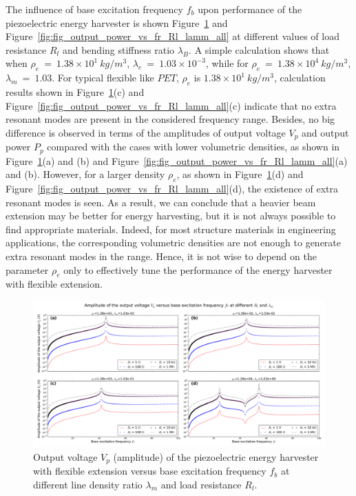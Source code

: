 \documentclass{elsarticle}
\begin{document}
The influence of base excitation frequency $f_b$ upon performance of the piezoelectric energy harvester is shown Figure~\ref{fig:fig_output_voltage_vs_fr_Rl_lamm_all} and Figure~\ref{fig:fig_output_power_vs_fr_Rl_lamm_all} at different values of load resistance $R_l$ and bending stiffness ratio $\lambda_B$. A simple calculation shows that when $\rho_e\ =\ 1.38\times10^1\ kg/m^3$, $\lambda_e\ =\ 1.03\times10^{-3}$, while for $\rho_e\ =\ 1.38\times10^4\ kg/m^3$, $\lambda_m\ =\ 1.03$. For typical flexible like $PET$\cite{dean1999lange}, $\rho_e$ is $1.38\times10^1\ kg/m^3$, calculation results shown in Figure~\ref{fig:fig_output_voltage_vs_fr_Rl_lamm_all}(c) and Figure~\ref{fig:fig_output_power_vs_fr_Rl_lamm_all}(c) indicate that no extra resonant modes are present in the considered frequency range. Besides, no big difference is observed in terms of the amplitudes of output voltage $V_p$ and output power $P_p$ compared with the cases with lower volumetric densities, as shown in Figure~\ref{fig:fig_output_voltage_vs_fr_Rl_lamm_all}(a) and (b) and Figure~\ref{fig:fig_output_power_vs_fr_Rl_lamm_all}(a) and (b). However, for a larger density $\rho_e$, as shown in Figure~\ref{fig:fig_output_voltage_vs_fr_Rl_lamm_all}(d) and Figure~\ref{fig:fig_output_power_vs_fr_Rl_lamm_all}(d), the existence of extra resonant modes is seen. As a result, we can conclude that a heavier beam extension may be better for energy harvesting, but it is not always possible to find appropriate materials. Indeed, for most structure materials in engineering applications, the corresponding volumetric densities are not enough to generate extra resonant modes in the range. Hence, it is not wise to depend on the parameter $\rho_e$ only to effectively tune the performance of the energy harvester with flexible extension. 

\begin{figure}[!htbp]
    \centering
    \includegraphics[width=\textwidth]{./fig_output_voltage_vs_fr_Rl_lamm_all}
    \caption{Output voltage $V_p$ (amplitude) of the piezoelectric energy harvester with flexible extension versus base excitation frequency $f_b$ at different line density ratio $\lambda_m$ and load resistance $R_l$.}
    \label{fig:fig_output_voltage_vs_fr_Rl_lamm_all}
\end{figure}
\end{document}

